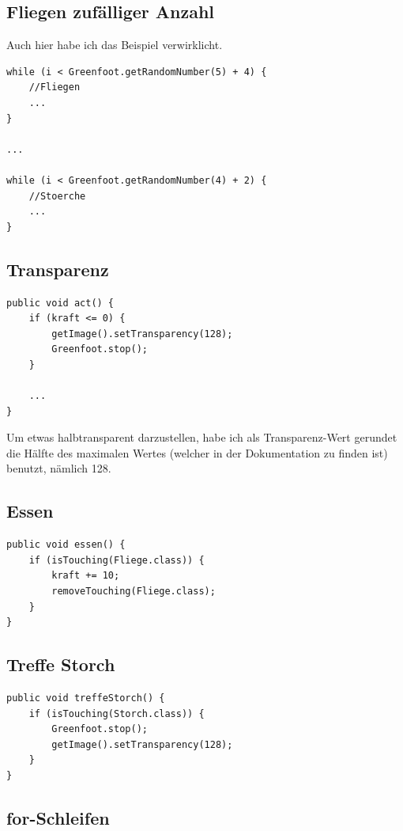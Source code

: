 \documentclass{scrartcl}   %
\begin{document}
\subsection{Fliegen zufälliger Anzahl}

Auch hier habe ich das Beispiel verwirklicht.\\
\begin{lstlisting}
while (i < Greenfoot.getRandomNumber(5) + 4) {
    //Fliegen
    ...
}

...

while (i < Greenfoot.getRandomNumber(4) + 2) {
    //Stoerche
    ...
}
\end{lstlisting}

\subsection{Transparenz}

\begin{lstlisting}
public void act() {
    if (kraft <= 0) {
        getImage().setTransparency(128);
        Greenfoot.stop();
    }

    ...
}
\end{lstlisting}

Um etwas halbtransparent darzustellen, habe ich als Transparenz-Wert gerundet die Hälfte des maximalen Wertes (welcher in der Dokumentation zu finden ist) benutzt, nämlich 128.

\subsection{Essen}

\begin{lstlisting}
public void essen() {
    if (isTouching(Fliege.class)) {
        kraft += 10;
        removeTouching(Fliege.class);
    }
}
\end{lstlisting}

\subsection{Treffe Storch}

\begin{lstlisting}
public void treffeStorch() {
    if (isTouching(Storch.class)) {
        Greenfoot.stop();
        getImage().setTransparency(128);
    }
}
\end{lstlisting}

\newpage

\subsection{for-Schleifen}
\end{document}
